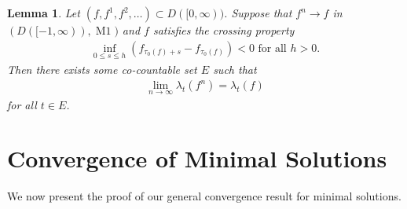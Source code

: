 \documentclass[12pt]{amsart}
\theoremstyle{plain}
\newtheorem{lem}[thm]{Lemma}
\theoremstyle{definition}
\begin{document}
\begin{lem}\label{lem:cross}
Let $(f,f^1,f^2,\dots)\subset D([0,\infty))$. Suppose that $f^n\to f$ in $(D([-1,\infty)),\operatorname{M1})$ and $f$ satisfies the crossing property
\begin{align}\label{eq:cross}
\inf_{0\le s \le h}(f_{\tau_0(f)+s}-f_{\tau_0(f)})<0\text{ for all }h>0.
\end{align}
Then there exists some co-countable set $E$ such that
\begin{align}
\lim_{n\to\infty} \lambda_t(f^n)=\lambda_t(f)
\end{align}
for all $t\in E$.
\end{lem}

\section{Convergence of Minimal Solutions}\label{sec:rc}

We now present the proof of our general convergence result for minimal solutions.
\end{document}
